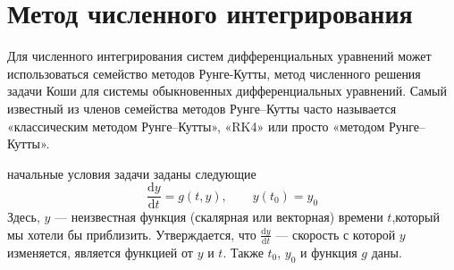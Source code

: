 \documentclass[a4paper,12pt]{article}
\newcommand{\dd}{\mathrm{d}}
\begin{document}
	\section{Метод численного интегрирования}
	Для численного интегрирования систем дифференциальных уравнений может использоваться семейство методов Рунге-Кутты, метод численного решения задачи Коши для системы обыкновенных дифференциальных уравнений. Самый известный из членов семейства методов Рунге–Кутты часто называется «классическим методом Рунге–Кутты», «RK4» или просто «методом Рунге–Кутты».
	
	начальные условия задачи заданы следующие
	\begin{equation}\label{eq:2} 
		\frac{\dd y}{\dd t}=g(t,y),\qquad y(t_0)=y_0
	\end{equation}
	Здесь, \(y\) — неизвестная функция (скалярная или векторная) времени \(t\),который мы хотели бы приблизить. Утверждается, что \(\frac{\dd y}{\dd t}\) — скорость с которой \(y\) изменяется, является функцией от \(y\) и \(t\). Также \(t_0\), \(y_0\) и функция \(g\) даны.
	
\end{document}
